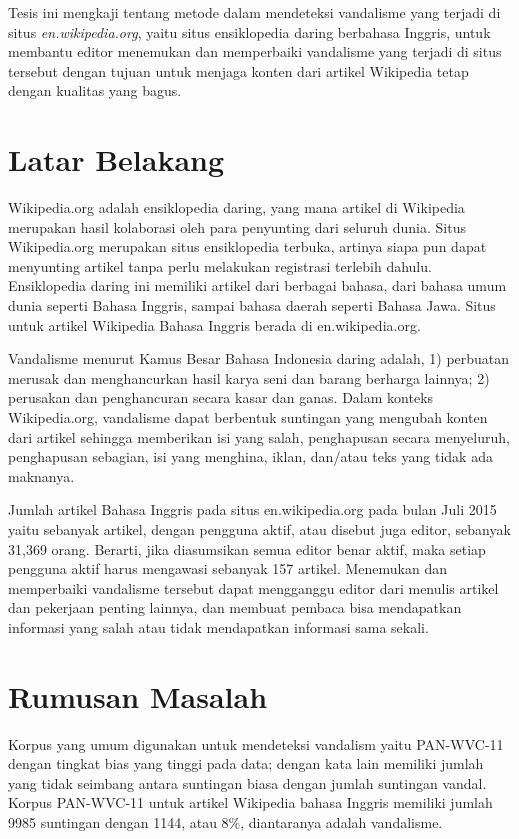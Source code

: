 \documentclass[12pt,a4paper,titlepage]{article}
\begin{document}
Tesis ini mengkaji tentang metode dalam mendeteksi vandalisme yang terjadi di
situs \textit{en.wikipedia.org}, yaitu situs ensiklopedia daring berbahasa
Inggris, untuk membantu editor menemukan dan memperbaiki vandalisme yang
terjadi di situs tersebut dengan tujuan untuk menjaga konten dari artikel
Wikipedia tetap dengan kualitas yang bagus.

\section{Latar Belakang}\label{sec:latar-belakang}

Wikipedia.org adalah ensiklopedia daring, yang mana artikel di Wikipedia
merupakan hasil kolaborasi oleh para penyunting dari seluruh dunia. Situs
Wikipedia.org merupakan situs ensiklopedia terbuka, artinya siapa pun dapat
menyunting artikel tanpa perlu melakukan registrasi terlebih dahulu.
Ensiklopedia daring ini memiliki artikel dari berbagai bahasa, dari bahasa umum
dunia seperti Bahasa Inggris, sampai bahasa daerah seperti Bahasa Jawa. Situs
untuk artikel Wikipedia Bahasa Inggris berada di en.wikipedia.org.

Vandalisme menurut Kamus Besar Bahasa Indonesia daring adalah, 1) perbuatan
merusak dan menghancurkan hasil karya seni dan barang berharga lainnya; 2)
perusakan dan penghancuran secara kasar dan ganas. Dalam konteks Wikipedia.org,
vandalisme dapat berbentuk suntingan yang mengubah konten dari artikel sehingga
memberikan isi yang salah, penghapusan secara menyeluruh, penghapusan sebagian,
isi yang menghina, iklan, dan/atau teks yang tidak ada maknanya.

Jumlah artikel Bahasa Inggris pada situs en.wikipedia.org pada bulan Juli
2015 yaitu sebanyak  artikel, dengan pengguna aktif, atau disebut juga
editor, sebanyak 31,369 orang. Berarti, jika diasumsikan semua editor benar
aktif, maka setiap pengguna aktif harus mengawasi sebanyak 157 artikel.
Menemukan dan memperbaiki vandalisme tersebut dapat mengganggu editor dari
menulis artikel dan pekerjaan penting lainnya, dan membuat pembaca bisa
mendapatkan informasi yang salah atau tidak mendapatkan informasi
sama sekali.

\section{Rumusan Masalah}\label{sec:rumusan-masalah}

Korpus yang umum digunakan untuk mendeteksi vandalism yaitu PAN-WVC-11 dengan
tingkat bias yang tinggi pada data; dengan kata lain memiliki jumlah yang tidak
seimbang antara suntingan biasa dengan jumlah suntingan vandal. Korpus
PAN-WVC-11 untuk artikel Wikipedia bahasa Inggris memiliki jumlah 9985 suntingan
dengan 1144, atau 8\%, diantaranya adalah vandalisme.
\end{document}
